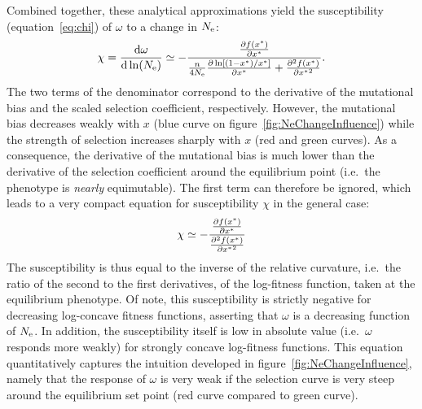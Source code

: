 \documentclass[authoryear]{elsarticle} %
\begin{document}
Combined together, these analytical approximations yield the susceptibility (equation~\ref{eq:chi}) of $\omega$ to a change in $N_{\text{e}}$:
\begin{gather}
    \chi = \frac{ \mathrm{d} \omega}{\mathrm{d} \ln (N_{\text{e}})} \simeq - \frac{\frac{ \partial f (x^{*}) }{\partial {x^{*}}}}{\frac{n}{4 N_{\text{e}}} \frac{\partial \ln [ (1 - x^{*}) / x^{*} ]}{\partial x^{*} } + \frac{ \partial^2 f (x^{*}) }{\partial {x^{*}}^2}}.
\end{gather}
The two terms of the denominator correspond to the derivative of the mutational bias and the scaled selection coefficient, respectively.
However, the mutational bias decreases weakly with $x$ (blue curve on figure~\ref{fig:NeChangeInfluence}) while the strength of selection increases sharply with $x$ (red and green curves).
As a consequence, the derivative of the mutational bias is much lower than the derivative of the selection coefficient around the equilibrium point (i.e.~the {phenotype} is \textit{nearly} equimutable).
The first term can therefore be ignored, which leads to a very compact equation for susceptibility $\chi$ in the general case:
\begin{gather}
    \chi \simeq - \frac{\frac{ \partial f (x^{*}) }{\partial {x^{*}}}}{\frac{ \partial^2 f (x^{*}) }{\partial {x^{*}}^2}}
\end{gather}
The susceptibility is thus equal to the inverse of the relative curvature, i.e.~the ratio of the second to the first derivatives, of the log-fitness function, taken at the equilibrium {phenotype}.
Of note, this susceptibility is strictly negative for decreasing log-concave fitness functions, asserting that $\omega$ is a decreasing function of $N_{\text{e}}$.
In addition, the susceptibility itself is low in absolute value (i.e.~$\omega$ responds more weakly) for strongly concave log-fitness functions.
This equation quantitatively captures the intuition developed in figure~\ref{fig:NeChangeInfluence}, namely that the response of $\omega$ is very weak if the selection curve is very steep around the equilibrium set point (red curve compared to green curve).
\end{document}
